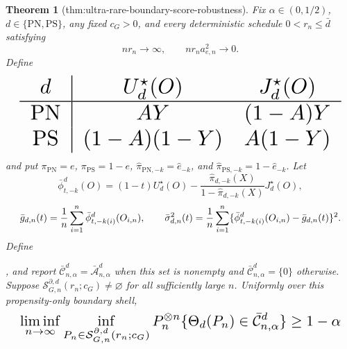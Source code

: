\documentclass{article}
\newtheorem{theorem}{Theorem}
\begin{document}
\begin{theorem}[thm:ultra-rare-boundary-score-robustness]\label{thm:ultra-rare-boundary-score-robustness}
Fix \(\alpha\in(0,1/2)\), \(d\in\{\mathrm{PN},\mathrm{PS}\}\), any fixed \(c_G>0\), and every deterministic schedule \(0<r_n\le\bar d\) satisfying
\[nr_n\longrightarrow\infty,\qquad nr_na_{e,n}^2\longrightarrow0.\]
Define
\[
\makebox[\linewidth][c]{\resizebox{0.98\linewidth}{!}{\par\noindent \makebox[\linewidth][c]{\resizebox{0.98\linewidth}{!}{\(\displaystyle \displaystyle \begin{array}{c|cc}d&U_d^\star(O)&J_d^\star(O)\\ \hline\mathrm{PN}&AY&(1-A)Y\\\mathrm{PS}&(1-A)(1-Y)&A(1-Y)\end{array}\)}}\par\noindent}}
\]
and put \(\pi_{\mathrm{PN}}=e\), \(\pi_{\mathrm{PS}}=1-e\), \(\widehat\pi_{\mathrm{PN},-k}=\widehat e_{-k}\), and \(\widehat\pi_{\mathrm{PS},-k}=1-\widehat e_{-k}\). Let
\[\bar\phi_{t,-k}^d(O)=(1-t)U_d^\star(O)-\frac{\widehat\pi_{d,-k}(X)}{1-\widehat\pi_{d,-k}(X)}J_d^\star(O),\]
\[
\makebox[\linewidth][c]{\resizebox{0.98\linewidth}{!}{\par\noindent \makebox[\linewidth][c]{\resizebox{0.98\linewidth}{!}{\(\displaystyle \displaystyle \bar g_{d,n}(t)=\frac1n\sum_{i=1}^n\bar\phi_{t,-k(i)}^d(O_{i,n}),\qquad \bar\sigma_{d,n}^2(t)=\frac1n\sum_{i=1}^n\{\bar\phi_{t,-k(i)}^d(O_{i,n})-\bar g_{d,n}(t)\}^2.\)}}\par\noindent}}
\]
Define \par\noindent {}\par\noindent, and report \(\bar{\mathcal C}_{n,\alpha}^d=\bar{\mathcal A}_{n,\alpha}^d\) when this set is nonempty and \(\bar{\mathcal C}_{n,\alpha}^d=\{0\}\) otherwise. Suppose \(\mathcal S_{G,n}^{\partial,d}(r_n;c_G)\ne\varnothing\) for all sufficiently large \(n\). Uniformly over this propensity-only boundary shell,
\[
\makebox[\linewidth][c]{\resizebox{0.98\linewidth}{!}{\par\noindent \makebox[\linewidth][c]{\resizebox{0.98\linewidth}{!}{\(\displaystyle \displaystyle \liminf_{n\to\infty}\inf_{P_n\in\mathcal S_{G,n}^{\partial,d}(r_n;c_G)}P_n^{\otimes n}\{\Theta_d(P_n)\in\bar{\mathcal C}_{n,\alpha}^d\}\ge1-\alpha\)}}\par\noindent}}
\]
\end{theorem}
\end{document}
